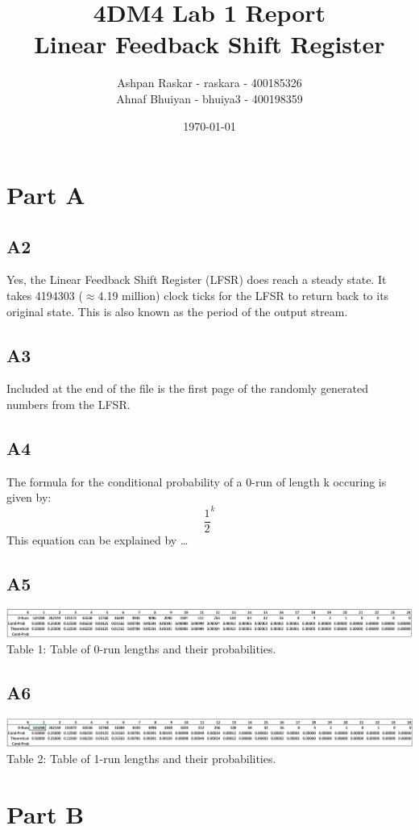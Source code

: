 \documentclass[12pt, letterpaper, titlepage, hidelinks]{article}
\title{4DM4 Lab 1 Report \\ Linear Feedback Shift Register}
\author{Ashpan Raskar - raskara - 400185326\\
		Ahnaf Bhuiyan - bhuiya3 - 400198359}
\date{\today}
\begin{document}
\maketitle
\newpage
\setlength{\parindent}{0pt}
\setcounter{secnumdepth}{0}
\section{Part A}
	\subsection{A2}
		Yes, the Linear Feedback Shift Register (LFSR) does reach a steady state. It takes 4194303 ($\approx$4.19 million) clock ticks for the LFSR to return back to its original state. This is also known as the period of the output stream.
	\subsection{A3}
		Included at the end of the file is the first page of the randomly generated numbers from the LFSR.
	\subsection{A4}
		The formula for the conditional probability of a 0-run of length k occuring is given by:
		\begin{equation}
			\frac{1}{2}^{k}
		\end{equation}
		This equation can be explained by \ldots
	\subsection{A5}
		\includegraphics[width=\textwidth]{0_run_table}
		Table 1: Table of 0-run lengths and their probabilities.
	\subsection{A6}
		\includegraphics[width=\textwidth]{1_run_table}
		Table 2: Table of 1-run lengths and their probabilities.
\section{Part B}
\end{document}
